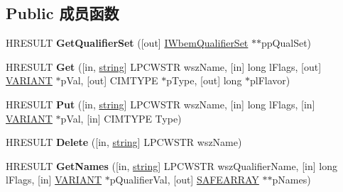 \subsection*{Public 成员函数}
\begin{DoxyCompactItemize}
\item 
\mbox{\label{interface_i_wbem_class_object_aae99e875715cc307f5f8cef62b2bcf05}} 
H\+R\+E\+S\+U\+LT {\bfseries Get\+Qualifier\+Set} (\mbox{[}out\mbox{]} \hyperlink{interface_i_wbem_qualifier_set}{I\+Wbem\+Qualifier\+Set} $\ast$$\ast$pp\+Qual\+Set)
\item 
\mbox{\label{interface_i_wbem_class_object_a4447a3e4230c927067a2e361c34ce00d}} 
H\+R\+E\+S\+U\+LT {\bfseries Get} (\mbox{[}in, \hyperlink{structstring}{string}\mbox{]} L\+P\+C\+W\+S\+TR wsz\+Name, \mbox{[}in\mbox{]} long l\+Flags, \mbox{[}out\mbox{]} \hyperlink{structtag_v_a_r_i_a_n_t}{V\+A\+R\+I\+A\+NT} $\ast$p\+Val, \mbox{[}out\mbox{]} C\+I\+M\+T\+Y\+PE $\ast$p\+Type, \mbox{[}out\mbox{]} long $\ast$pl\+Flavor)
\item 
\mbox{\label{interface_i_wbem_class_object_a51a2162b48b947bd04b99af40c7ec03e}} 
H\+R\+E\+S\+U\+LT {\bfseries Put} (\mbox{[}in, \hyperlink{structstring}{string}\mbox{]} L\+P\+C\+W\+S\+TR wsz\+Name, \mbox{[}in\mbox{]} long l\+Flags, \mbox{[}in\mbox{]} \hyperlink{structtag_v_a_r_i_a_n_t}{V\+A\+R\+I\+A\+NT} $\ast$p\+Val, \mbox{[}in\mbox{]} C\+I\+M\+T\+Y\+PE Type)
\item 
\mbox{\label{interface_i_wbem_class_object_a6216119feeb4001de7984961caddf560}} 
H\+R\+E\+S\+U\+LT {\bfseries Delete} (\mbox{[}in, \hyperlink{structstring}{string}\mbox{]} L\+P\+C\+W\+S\+TR wsz\+Name)
\item 
\mbox{\label{interface_i_wbem_class_object_a2bb004568ba443333b6de44418726433}} 
H\+R\+E\+S\+U\+LT {\bfseries Get\+Names} (\mbox{[}in, \hyperlink{structstring}{string}\mbox{]} L\+P\+C\+W\+S\+TR wsz\+Qualifier\+Name, \mbox{[}in\mbox{]} long l\+Flags, \mbox{[}in\mbox{]} \hyperlink{structtag_v_a_r_i_a_n_t}{V\+A\+R\+I\+A\+NT} $\ast$p\+Qualifier\+Val, \mbox{[}out\mbox{]} \hyperlink{structtag_s_a_f_e_a_r_r_a_y}{S\+A\+F\+E\+A\+R\+R\+AY} $\ast$$\ast$p\+Names)
\item 

\end{DoxyCompactItemize}
